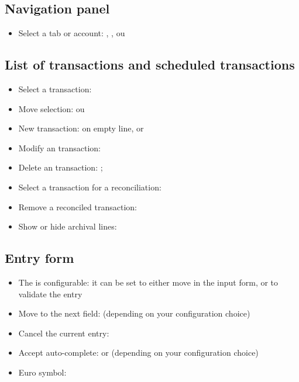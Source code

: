 \subsection{Navigation panel}

\begin{itemize}
	\item Select a tab or account: , ,  ou 
\end{itemize}

\subsection{List of transactions and scheduled transactions}

\begin{itemize}
	\item Select a transaction: 
	\item Move selection: ou 
	\item New transaction:   on empty line, or 
	\item Modify an transaction: 
	\item Delete an transaction: ;
	\item Select a transaction for a reconciliation:
	\item Remove a reconciled transaction: 
	\item Show or hide archival lines: 
\end{itemize}


\subsection{Entry form}

\begin{itemize}
	\item The  is configurable: it can be set to either move in the input form, or to validate the entry
	\item Move to the next field:  (depending on your configuration choice)
	\item Cancel the current entry: 
	\item Accept auto-complete:  or  (depending on your configuration choice)
	\item  Euro symbol: 
\end{itemize}

